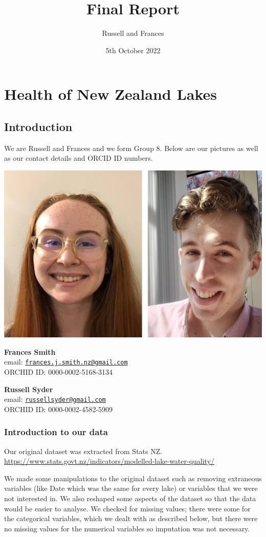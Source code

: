 \documentclass[
]{article}
\title{Final Report}
\author{Russell and Frances}
\date{5th October 2022}
\begin{document}
\maketitle

{
\setcounter{tocdepth}{2}
\tableofcontents
}
\hypertarget{health-of-new-zealand-lakes}{%
\section{Health of New Zealand Lakes}\label{health-of-new-zealand-lakes}}

\hypertarget{introduction}{%
\subsection{Introduction}\label{introduction}}

We are Russell and Frances and we form Group 8. Below are our pictures as well as our contact details and ORCID ID numbers.

\includegraphics[width=0.4\linewidth,height=0.3\textheight]{../Presentations/Russell and Frances}

\textbf{Frances Smith}\\
email: \href{mailto:frances.j.smith.nz@gmail.com}{\nolinkurl{frances.j.smith.nz@gmail.com}}\\
ORCHID ID: 0000-0002-5168-3134

\textbf{Russell Syder}\\
email: \href{mailto:russellsyder@gmail.com}{\nolinkurl{russellsyder@gmail.com}}\\
ORCHID ID: 0000-0002-4582-5909

\hypertarget{introduction-to-our-data}{%
\subsubsection{Introduction to our data}\label{introduction-to-our-data}}

Our original dataset was extracted from Stats NZ.
\url{https://www.stats.govt.nz/indicators/modelled-lake-water-quality/}

We made some manipulations to the original dataset such as removing extraneous variables (like Date which was the same for every lake) or variables that we were not interested in. We also reshaped some aspects of the dataset so that the data would be easier to analyse. We checked for missing values; there were some for the categorical variables, which we dealt with as described below, but there were no missing values for the numerical variables so imputation was not necessary.
\end{document}
